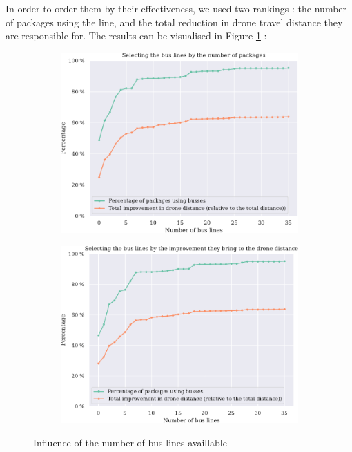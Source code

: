 In order to order them by their effectiveness, we used two rankings : the number of packages using the line, and the total reduction in drone travel distance they are responsible for. The results can be visualised in Figure \ref{fig:lines_absolute} :
\begin{figure}
    \centering
    \begin{subfigure}[t]{0.49\linewidth}
        \centering
        \includegraphics[width=0.9\linewidth]{"../fig/buslines_number_crop.pdf"}
    \end{subfigure}
    \begin{subfigure}[t]{0.49\linewidth}
        \centering
        \includegraphics[width=0.9\linewidth]{"../fig/buslines_improvement_crop.pdf"}
    \end{subfigure}
    \caption{Influence of the number of bus lines availlable}
    \label{fig:lines_absolute}
\end{figure}

